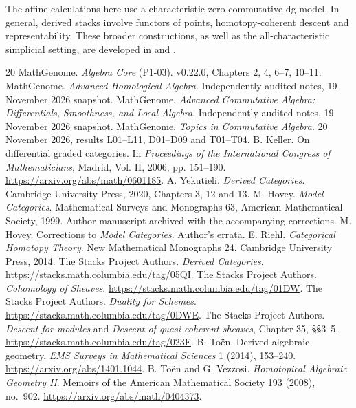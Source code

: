 \documentclass[11pt,oneside,openany]{book}
\theoremstyle{definition}
\theoremstyle{remark}
\begin{document}
The affine calculations here use a characteristic-zero commutative
dg model. In general, derived stacks involve functors of points,
homotopy-coherent descent and representability. These broader
constructions, as well as the all-characteristic simplicial
setting, are developed in \cite[\S\S1.2.12 and 2.2.3]{hag} and
\cite[\S\S2 and 4]{toen}.
\backmatter
\begingroup
\small
\begin{thebibliography}{20}
\setlength{\itemsep}{0.2\baselineskip}
\setlength{\parsep}{0pt}
 MathGenome. \emph{Algebra Core} (P1-03). v0.22.0,
  Chapters 2, 4, 6--7, 10--11.
 MathGenome. \emph{Advanced Homological Algebra}.
  Independently audited notes, 19 November 2026 snapshot.
 MathGenome. \emph{Advanced Commutative Algebra:
  Differentials, Smoothness, and Local Algebra}. Independently audited
  notes, 19 November 2026 snapshot.
 MathGenome. \emph{Topics in Commutative Algebra}.
  20 November 2026, results L01--L11, D01--D09 and T01--T04.
 B. Keller. On differential graded categories.
  In \emph{Proceedings of the International Congress of Mathematicians},
  Madrid, Vol. II, 2006, pp. 151--190. \url{https://arxiv.org/abs/math/0601185}.
 A. Yekutieli. \emph{Derived Categories}.
  Cambridge University Press, 2020, Chapters 3, 12 and 13.
 M. Hovey. \emph{Model Categories}.
  Mathematical Surveys and Monographs 63, American Mathematical Society,
  1999. Author manuscript archived with the accompanying corrections.
 M. Hovey. Corrections to \emph{Model Categories}.
  Author's errata.
 E. Riehl. \emph{Categorical Homotopy Theory}.
  New Mathematical Monographs 24, Cambridge University Press, 2014.
 The Stacks Project Authors. \emph{Derived Categories}.
  \url{https://stacks.math.columbia.edu/tag/05QI}.
 The Stacks Project Authors. \emph{Cohomology of Sheaves}.
  \url{https://stacks.math.columbia.edu/tag/01DW}.
 The Stacks Project Authors. \emph{Duality for Schemes}.
  \url{https://stacks.math.columbia.edu/tag/0DWE}.
 The Stacks Project Authors. \emph{Descent for modules}
  and \emph{Descent of quasi-coherent sheaves}, Chapter 35, \S\S3--5.
  \url{https://stacks.math.columbia.edu/tag/023F}.
 B. To\"en. Derived algebraic geometry.
  \emph{EMS Surveys in Mathematical Sciences} 1 (2014), 153--240.
  \url{https://arxiv.org/abs/1401.1044}.
 B. To\"en and G. Vezzosi.
  \emph{Homotopical Algebraic Geometry II}.
  Memoirs of the American Mathematical Society 193 (2008), no.\ 902.
  \url{https://arxiv.org/abs/math/0404373}.
\end{thebibliography}
\endgroup
\end{document}
